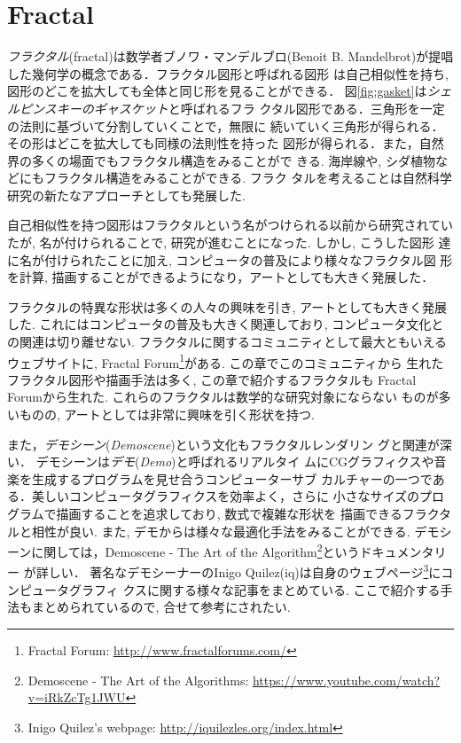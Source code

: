 
\section{Fractal}

\emph{フラクタル}(fractal)は数学者ブノワ・マンデルブロ(Benoit
B. Mandelbrot)が提唱した幾何学の概念である．フラクタル図形と呼ばれる図形
は自己相似性を持ち, 図形のどこを拡大しても全体と同じ形を見ることができる．
図\ref{fig:gasket}は\emph{シェルピンスキーのギャスケット}と呼ばれるフラ
クタル図形である．三角形を一定の法則に基づいて分割していくことで，無限に
続いていく三角形が得られる．その形はどこを拡大しても同様の法則性を持った
図形が得られる．また，自然界の多くの場面でもフラクタル構造をみることがで
きる. 海岸線や, シダ植物などにもフラクタル構造をみることができる. フラク
タルを考えることは自然科学研究の新たなアプローチとしても発展した.

自己相似性を持つ図形はフラクタルという名がつけられる以前から研究されてい
たが, 名が付けられることで, 研究が進むことになった. しかし, こうした図形
達に名が付けられたことに加え, コンピュータの普及により様々なフラクタル図
形を計算, 描画することができるようになり，アートとしても大きく発展した．

フラクタルの特異な形状は多くの人々の興味を引き, アートとしても大きく発展
した. これにはコンピュータの普及も大きく関連しており, コンピュータ文化と
の関連は切り離せない. フラクタルに関するコミュニティとして最大ともいえる
ウェブサイトに, Fractal Forum\footnote{Fractal Forum:
\url{http://www.fractalforums.com/}}がある. この章でこのコミュニティから
生れたフラクタル図形や描画手法は多く, この章で紹介するフラクタルも
Fractal Forumから生れた. これらのフラクタルは数学的な研究対象にならない
ものが多いものの, アートとしては非常に興味を引く形状を持つ.

また，\emph{デモシーン}({\it Demoscene})という文化もフラクタルレンダリン
グと関連が深い．
デモシーンは\emph{デモ}({\it Demo})と呼ばれるリアルタイ
ムにCGグラフィクスや音楽を生成するプログラムを見せ合うコンピューターサブ
カルチャーの一つである．美しいコンピュータグラフィクスを効率よく，さらに
小さなサイズのプログラムで描画することを追求しており, 数式で複雑な形状を
描画できるフラクタルと相性が良い.
また, デモからは様々な最適化手法をみることができる.
 デモシーンに関しては，Demoscene - The
 Art of the Algorithm\footnote{Demoscene - The Art of the Algorithms:
 \url{https://www.youtube.com/watch?v=iRkZcTg1JWU}}というドキュメンタリー
 が詳しい．
著名なデモシーナーのInigo Quilez(iq)は自身のウェブページ\footnote{Inigo
Quilez's webpage: \url{http://iquilezles.org/index.html}}にコンピュータグラフィ
 クスに関する様々な記事をまとめている.
 ここで紹介する手法もまとめられているので, 合せて参考にされたい.

